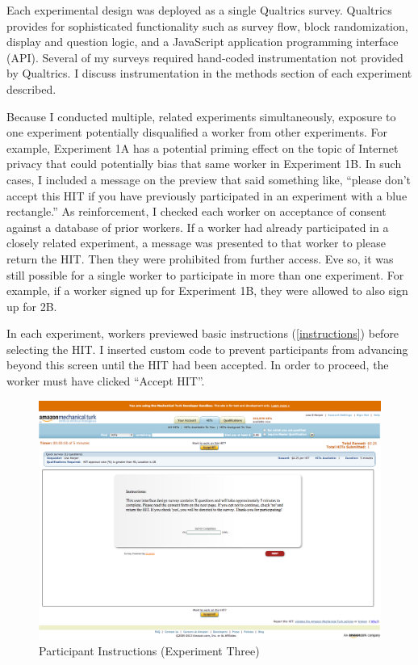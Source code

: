 \begin{sloppier}
Each experimental design was deployed as a single Qualtrics survey. Qualtrics provides for sophisticated functionality such as survey flow, block randomization, display and question logic, and a JavaScript application programming interface (API). Several of my surveys required hand-coded instrumentation not provided by Qualtrics. I  discuss instrumentation in the methods section of each experiment described.
\end{sloppier}

Because I conducted multiple, related experiments simultaneously, exposure to one experiment potentially disqualified a worker from other experiments. For example, Experiment 1A has a potential priming effect on the topic of Internet privacy that could potentially bias that same worker in Experiment 1B. In such cases, I included a message on the preview that said something like, ``please don't accept this HIT if you have previously participated in an experiment with a blue rectangle.'' As reinforcement, I checked each worker on acceptance of consent against a database of prior workers. If a worker had already participated in a closely related experiment, a message was presented to that worker to please return the HIT. Then they were prohibited from further access. Eve so, it was still possible for a single worker to participate in more than one experiment. For example, if a worker signed up for Experiment 1B, they were allowed to also sign up for 2B. 

In each experiment, workers previewed basic instructions  (\autoref{instructions})  before selecting the HIT. I inserted custom code to prevent participants from advancing beyond this screen until the HIT had been accepted. In order to proceed, the worker must have clicked ``Accept HIT''.


\begin{figure}
\centerline{
  \includegraphics[scale=.4]{chapter4.tex/instructions}
  }
\caption{Participant Instructions (Experiment Three)}
\label{instructions}
\end{figure}


